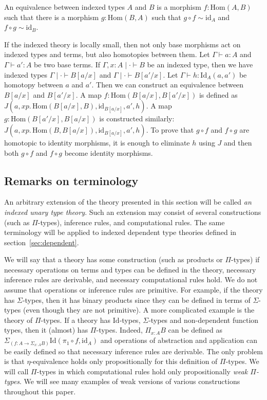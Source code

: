 \documentclass[reqno]{mscs}
\newcommand{\ob}{}
\newcommand{\fs}[1]{\mathrm{#1}}
\newcommand{\Hom}{\fs{Hom}}
\newcommand{\Id}{\fs{Id}}
\newcommand{\id}{\fs{id}}
\numberwithin{figure}{section}
\begin{document}
\begin{defn}[equiv]
An equivalence between indexed types $A$ and $B$ is a morphism $f : \Hom(A,B)$ such that there is a morphism $g : \Hom(B,A)$ such that $g \circ f \sim \id_A$ and $f \circ g \sim \id_B$.
\end{defn}

If the indexed theory is locally small, then not only base morphisms act on indexed types and terms, but also homotopies between them.
Let $\Gamma \vdash a : A$ and $\Gamma \vdash a' : A$ be two base terms.
If $\Gamma, x : A \mid \cdot \vdash B \ob$ be an indexed type, then we have indexed types $\Gamma \mid \cdot \vdash B[a/x] \ob$ and $\Gamma \mid \cdot \vdash B[a'/x] \ob$.
Let $\Gamma \vdash h : \Id_A(a,a')$ be homotopy between $a$ and $a'$.
Then we can construct an equivalence between $B[a/x]$ and $B[a'/x]$.
A map $f : \Hom(B[a/x],B[a'/x])$ is defined as $J(a, x p.\,\Hom(B[a/x],B), \id_{B[a/x]}, a', h)$.
A map $g : \Hom(B[a'/x],B[a/x])$ is constructed similarly: $J(a, x p.\,\Hom(B,B[a/x]), \id_{B[a/x]}, a', h)$.
To prove that $g \circ f$ and $f \circ g$ are homotopic to identity morphisms, it is enough to eliminate $h$ using $J$ and then both $g \circ f$ and $f \circ g$ become identity morphisms.

\subsection{Remarks on terminology}

An arbitrary extension of the theory presented in this section will be called \emph{an indexed unary type theory}.
Such an extension may consist of several constructions (such as $\Pi$-types), inference rules, and computational rules.
The same terminology will be applied to indexed dependent type theories defined in section~\ref{sec:dependent}.

We will say that a theory has some construction (such as products or $\Pi$-types) if necessary operations on terms and types can be defined in the theory, necessary inference rules are derivable, and necessary computational rules hold.
We do not assume that operations or inference rules are primitive.
For example, if the theory has $\Sigma$-types, then it has binary products since they can be defined in terms of $\Sigma$-types (even though they are not primitive).
A more complicated example is the theory of $\Pi$-types.
If a theory has $\Id$-types, $\Sigma$-types and non-dependent function types, then it (almost) has $\Pi$-types.
Indeed, $\Pi_{x : A} B$ can be defined as $\Sigma_{(f : A \to \Sigma_{x : A} B)} \Id(\pi_1 \circ f, \id_A)$ and operations of abstraction and application can be easily defined so that necessary inference rules are derivable.
The only problem is that $\eta$-equivalence holds only propositionally for this definition of $\Pi$-types.
We will call $\Pi$-types in which computational rules hold only propositionally \emph{weak $\Pi$-types}.
We will see many examples of weak versions of various constructions throughout this paper.
\end{document}
